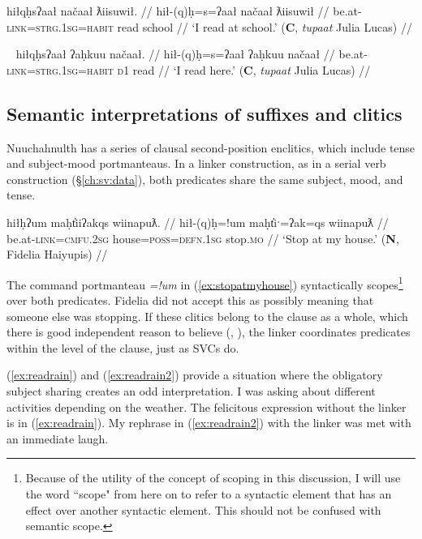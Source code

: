 \ex \label{ex:readatschool}
\begingl
\glpreamble hiłqḥsʔaał načaał ƛiisuwił. //
\gla hił-(q)ḥ=s=ʔaał načaał ƛiisuwił //
\glb be.at-\textsc{link}=\textsc{strg.1sg}=\textsc{habit} read school //
\glft `I read at school.' (\textbf{C}, \textit{tupaat} Julia Lucas) //
\endgl
\xe

\ex~ \label{ex:readatschool2}
\begingl
\glpreamble hiłqḥsʔaał ʔaḥkuu načaał. //
\gla hił-(q)ḥ=s=ʔaał ʔaḥkuu načaał //
\glb be.at-\textsc{link}=\textsc{strg.1sg}=\textsc{habit} \textsc{d1} read //
\glft `I read here.' (\textbf{C}, \textit{tupaat} Julia Lucas) //
\endgl
\xe

\subsection{Semantic interpretations of suffixes and clitics} \label{ch:link:second}

Nuuchahnulth has a series of clausal second-position enclitics, which include tense and subject-mood portmanteaus. In a linker construction, as in a serial verb construction (\S\ref{ch:sv:data}), both predicates share the same subject, mood, and tense.

\ex \label{ex:stopatmyhouse}
\begingl
\glpreamble hiłḥʔum maḥt̓iiʔakqs wiinapuƛ. //
\gla hił-(q)ḥ=!um maḥt̓iˑ=ʔak=qs wiinapuƛ //
\glb be.at-\textsc{link}=\textsc{cmfu.2sg} house=\textsc{poss}=\textsc{defn.1sg} stop.\textsc{mo} //
\glft `Stop at my house.' (\textbf{N}, Fidelia Haiyupis) //
\endgl
\xe

The command portmanteau \textit{=!um} in (\ref{ex:stopatmyhouse}) syntactically scopes\footnote{Because of the utility of the concept of scoping in this discussion, I will use the word ``scope" from here on to refer to a syntactic element that has an effect over another syntactic element. This should not be confused with semantic scope.} over both predicates. Fidelia did not accept this as possibly meaning that someone else was stopping. If these clitics belong to the clause as a whole, which there is good independent reason to believe (\citealt[35--36]{rose1981}, \citealt[42--50]{woo2007b}), the linker coordinates predicates within the level of the clause, just as SVCs do.

(\ref{ex:readrain}) and (\ref{ex:readrain2}) provide a situation where the obligatory subject sharing creates an odd interpretation. I was asking about different activities depending on the weather. The felicitous expression without the linker is in (\ref{ex:readrain}). My rephrase in (\ref{ex:readrain2}) with the linker was met with an immediate laugh.


